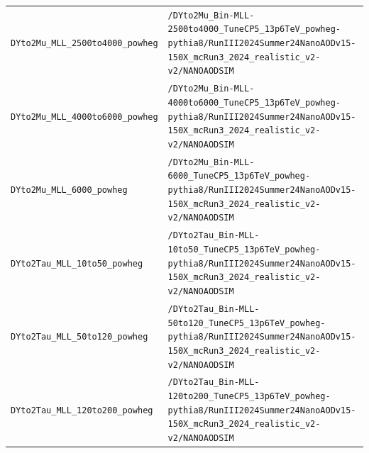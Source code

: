 \begin{longtable}{@{}>{\RaggedRight\arraybackslash}p{} >{\RaggedRight\arraybackslash}p{}@{}}
\addlinespace[2pt]
\texttt{DYto2Mu\_\allowbreak{}MLL\_\allowbreak{}2500to4000\_\allowbreak{}powheg} & \texttt{/\allowbreak{}DYto2Mu\_\allowbreak{}Bin-\allowbreak{}MLL-\allowbreak{}2500to4000\_\allowbreak{}TuneCP5\_\allowbreak{}13p6TeV\_\allowbreak{}powheg-\allowbreak{}pythia8/\allowbreak{}RunIII2024Summer24NanoAODv15-\allowbreak{}150X\_\allowbreak{}mcRun3\_\allowbreak{}2024\_\allowbreak{}realistic\_\allowbreak{}v2-\allowbreak{}v2/\allowbreak{}NANOAODSIM} \\
\addlinespace[2pt]
\texttt{DYto2Mu\_\allowbreak{}MLL\_\allowbreak{}4000to6000\_\allowbreak{}powheg} & \texttt{/\allowbreak{}DYto2Mu\_\allowbreak{}Bin-\allowbreak{}MLL-\allowbreak{}4000to6000\_\allowbreak{}TuneCP5\_\allowbreak{}13p6TeV\_\allowbreak{}powheg-\allowbreak{}pythia8/\allowbreak{}RunIII2024Summer24NanoAODv15-\allowbreak{}150X\_\allowbreak{}mcRun3\_\allowbreak{}2024\_\allowbreak{}realistic\_\allowbreak{}v2-\allowbreak{}v2/\allowbreak{}NANOAODSIM} \\
\addlinespace[2pt]
\texttt{DYto2Mu\_\allowbreak{}MLL\_\allowbreak{}6000\_\allowbreak{}powheg} & \texttt{/\allowbreak{}DYto2Mu\_\allowbreak{}Bin-\allowbreak{}MLL-\allowbreak{}6000\_\allowbreak{}TuneCP5\_\allowbreak{}13p6TeV\_\allowbreak{}powheg-\allowbreak{}pythia8/\allowbreak{}RunIII2024Summer24NanoAODv15-\allowbreak{}150X\_\allowbreak{}mcRun3\_\allowbreak{}2024\_\allowbreak{}realistic\_\allowbreak{}v2-\allowbreak{}v2/\allowbreak{}NANOAODSIM} \\
\addlinespace[2pt]
\texttt{DYto2Tau\_\allowbreak{}MLL\_\allowbreak{}10to50\_\allowbreak{}powheg} & \texttt{/\allowbreak{}DYto2Tau\_\allowbreak{}Bin-\allowbreak{}MLL-\allowbreak{}10to50\_\allowbreak{}TuneCP5\_\allowbreak{}13p6TeV\_\allowbreak{}powheg-\allowbreak{}pythia8/\allowbreak{}RunIII2024Summer24NanoAODv15-\allowbreak{}150X\_\allowbreak{}mcRun3\_\allowbreak{}2024\_\allowbreak{}realistic\_\allowbreak{}v2-\allowbreak{}v2/\allowbreak{}NANOAODSIM} \\
\addlinespace[2pt]
\texttt{DYto2Tau\_\allowbreak{}MLL\_\allowbreak{}50to120\_\allowbreak{}powheg} & \texttt{/\allowbreak{}DYto2Tau\_\allowbreak{}Bin-\allowbreak{}MLL-\allowbreak{}50to120\_\allowbreak{}TuneCP5\_\allowbreak{}13p6TeV\_\allowbreak{}powheg-\allowbreak{}pythia8/\allowbreak{}RunIII2024Summer24NanoAODv15-\allowbreak{}150X\_\allowbreak{}mcRun3\_\allowbreak{}2024\_\allowbreak{}realistic\_\allowbreak{}v2-\allowbreak{}v2/\allowbreak{}NANOAODSIM} \\
\addlinespace[2pt]
\texttt{DYto2Tau\_\allowbreak{}MLL\_\allowbreak{}120to200\_\allowbreak{}powheg} & \texttt{/\allowbreak{}DYto2Tau\_\allowbreak{}Bin-\allowbreak{}MLL-\allowbreak{}120to200\_\allowbreak{}TuneCP5\_\allowbreak{}13p6TeV\_\allowbreak{}powheg-\allowbreak{}pythia8/\allowbreak{}RunIII2024Summer24NanoAODv15-\allowbreak{}150X\_\allowbreak{}mcRun3\_\allowbreak{}2024\_\allowbreak{}realistic\_\allowbreak{}v2-\allowbreak{}v2/\allowbreak{}NANOAODSIM} \\

\end{longtable}
